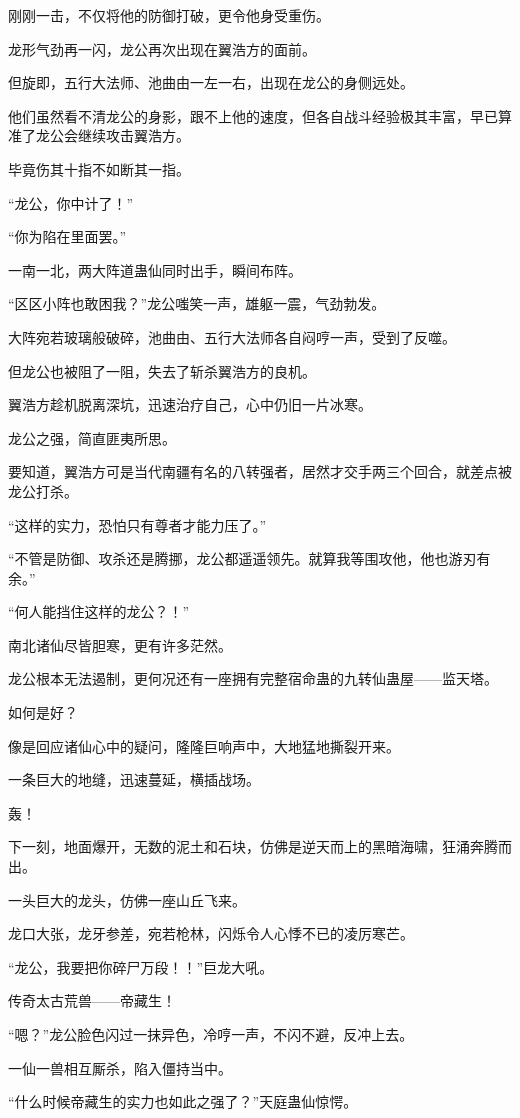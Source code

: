 \begin{this_body}
刚刚一击，不仅将他的防御打破，更令他身受重伤。

龙形气劲再一闪，龙公再次出现在翼浩方的面前。

但旋即，五行大法师、池曲由一左一右，出现在龙公的身侧远处。

他们虽然看不清龙公的身影，跟不上他的速度，但各自战斗经验极其丰富，早已算准了龙公会继续攻击翼浩方。

毕竟伤其十指不如断其一指。

“龙公，你中计了！”

“你为陷在里面罢。”

一南一北，两大阵道蛊仙同时出手，瞬间布阵。

“区区小阵也敢困我？”龙公嗤笑一声，雄躯一震，气劲勃发。

大阵宛若玻璃般破碎，池曲由、五行大法师各自闷哼一声，受到了反噬。

但龙公也被阻了一阻，失去了斩杀翼浩方的良机。

翼浩方趁机脱离深坑，迅速治疗自己，心中仍旧一片冰寒。

龙公之强，简直匪夷所思。

要知道，翼浩方可是当代南疆有名的八转强者，居然才交手两三个回合，就差点被龙公打杀。

“这样的实力，恐怕只有尊者才能力压了。”

“不管是防御、攻杀还是腾挪，龙公都遥遥领先。就算我等围攻他，他也游刃有余。”

“何人能挡住这样的龙公？！”

南北诸仙尽皆胆寒，更有许多茫然。

龙公根本无法遏制，更何况还有一座拥有完整宿命蛊的九转仙蛊屋——监天塔。

如何是好？

像是回应诸仙心中的疑问，隆隆巨响声中，大地猛地撕裂开来。

一条巨大的地缝，迅速蔓延，横插战场。

轰！

下一刻，地面爆开，无数的泥土和石块，仿佛是逆天而上的黑暗海啸，狂涌奔腾而出。

一头巨大的龙头，仿佛一座山丘飞来。

龙口大张，龙牙参差，宛若枪林，闪烁令人心悸不已的凌厉寒芒。

“龙公，我要把你碎尸万段！！”巨龙大吼。

传奇太古荒兽——帝藏生！

“嗯？”龙公脸色闪过一抹异色，冷哼一声，不闪不避，反冲上去。

一仙一兽相互厮杀，陷入僵持当中。

“什么时候帝藏生的实力也如此之强了？”天庭蛊仙惊愕。


\end{this_body}
